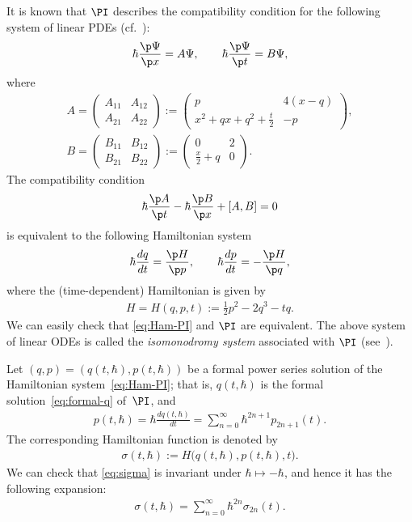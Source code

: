 It is known that $\PI$ describes the compatibility condition
for the following system of linear PDEs (cf.~\cite[Appendix C]{JM2}):
\begin{gather} \label{eq:Lax-matrix}
\hbar \frac{\p \Psi}{\p x}  = A \Psi, \qquad
\hbar \frac{\p \Psi}{\p t}  = B \Psi,
\end{gather}
where
\begin{gather*}
A   =
\begin{pmatrix}
A_{11} & A_{12} \\
A_{21} & A_{22}
\end{pmatrix}
:=
\begin{pmatrix}
  p
&
  4(x-q)
\\
\displaystyle x^{2} + q x + q^{2} + \frac{t}{2}
&
  - p
\end{pmatrix},
\\
B  =
\begin{pmatrix}
B_{11} & B_{12} \\
B_{21} & B_{22}
\end{pmatrix}
:=
\begin{pmatrix}
 0
&
   2
\\
\displaystyle \frac{x}{2} + q
&
  0
\end{pmatrix}.
\end{gather*}
The compatibility condition
\begin{gather*}
\hbar \frac{\p A}{\p t} - \hbar \frac{\p B}{\p x} + [A,B] = 0
\end{gather*}
is equivalent to the following Hamiltonian system
\begin{gather} \label{eq:Ham-PI}
\hbar \frac{dq}{dt} = \frac{\p H}{\p p}, \qquad
\hbar \frac{dp}{dt} = - \frac{\p H}{\p q},
\end{gather}
where the (time-dependent) Hamiltonian is given by
\begin{gather*}%
H = H(q,p,t) := \frac{1}{2}p^{2} - 2 q^{3} - t q.
\end{gather*}
We can easily check that \eqref{eq:Ham-PI} and $\PI$ are equivalent.
The above system of linear ODEs
is called the {\em isomonodromy system} associated with $\PI$
(see~\cite{JMU, JM2}).

Let $(q,p) = (q(t,\hbar), p(t,\hbar))$ be a formal power series
solution of the Hamiltonian system~\eqref{eq:Ham-PI}; that is,
$q(t,\hbar)$ is the formal solution~\eqref{eq:formal-q}
of~$\PI$, and
\begin{gather*} %
p(t,\hbar) = \hbar \frac{d q(t,\hbar)}{dt} =
\sum_{n=0}^{\infty} \hbar^{2n+1} p_{2n+1}(t).
\end{gather*}
The corresponding Hamiltonian function is denoted by
\begin{gather} \label{eq:sigma}
\sigma(t,\hbar) := H\big(q(t,\hbar), p(t,\hbar), t\big).
\end{gather}
We can check that \eqref{eq:sigma}
is invariant under $\hbar \mapsto - \hbar$, and hence
it has the following expansion:
\begin{gather} \label{eq:parity-sigma}
\sigma(t,\hbar) = \sum_{n=0}^{\infty} \hbar^{2n} \sigma_{2n}(t).
\end{gather}

